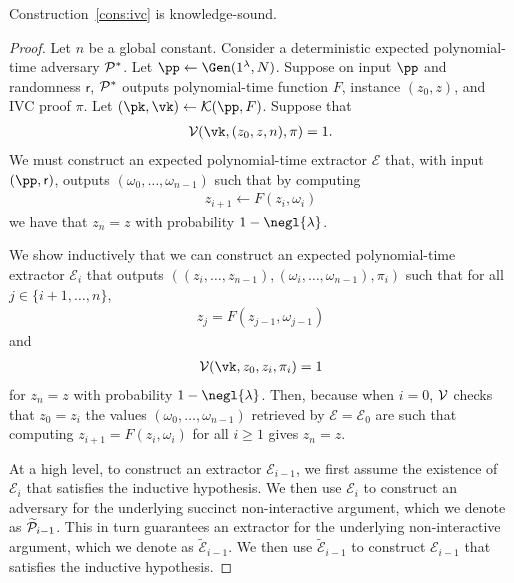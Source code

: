 \begin{lemma}
 Construction~\ref{cons:ivc}
 is knowledge-sound.
\end{lemma}


\begin{proof}
   Let $n$ be a global constant.
   Consider a deterministic expected polynomial-time adversary $\mathcal{P}^*$.
   Let $\pp \gets \Gen(1^{\lambda}, N)$.
   Suppose 
   on input $\pp$ and randomness $\mathsf{r}$,
   $\mathcal{P}^*$
   outputs 
   polynomial-time function $F$,
   instance $(z_0, z)$,
   and IVC proof $\pi$. 
   Let $(\pk, \vk) \gets \En(\pp, F)$.
   Suppose that
   \begin{align*}
     \V(\vk, (z_0, z, n), \pi) = 1.
   \end{align*}
   We must construct an expected polynomial-time extractor $\mathcal{E}$
   that, 
   with input $(\pp, \mathsf{r})$,
   outputs $(\omega_0, \ldots, \omega_{n - 1})$ 
   such that by computing
   \begin{align*}
     z_{i + 1} \gets F(z_{i}, \omega_{i})
   \end{align*}
   we have that $z_n = z$ with probability 
   $1 - \negl{\lambda}$.
   
   We show inductively that we can construct an expected polynomial-time extractor $\mathcal{E}_i$ that outputs 
   $((z_i, \ldots, z_{n - 1}), (\omega_i, \ldots, \omega_{n - 1}), \pi_i)$ such that for all $j \in  \{i + 1, \ldots, n\}$,
   \begin{align*}
     z_j = F(z_{j - 1}, \omega_{j - 1})
   \end{align*}
   and 
   \begin{align}\label{eq:ih:2}
     \V(\vk, z_0, z_i, \pi_i) = 1
   \end{align}
   for $z_n = z$ with probability $1 - \negl{\lambda}$.
   Then, 
   because when $i = 0$,
   $\mathcal{V}$ checks that $z_0 = z_i$ 
   the values $(\omega_0, \ldots, \omega_{n - 1})$ 
   retrieved by $\mathcal{E} = \mathcal{E}_0$
   are such that computing  
   $z_{i + 1} = F(z_i, \omega_i)$ for all $i \geq 1$ gives $z_n = z$.
   
   At a high level,
   to construct an extractor $\mathcal{E}_{i - 1}$,
   we first assume the existence of $\mathcal{E}_i$ that satisfies the inductive hypothesis. 
   We then use $\mathcal{E}_i$ to construct an adversary 
   for the underlying succinct non-interactive argument, which we denote as $\widetilde{\mathcal{P}}_{i - 1}$.
   This in turn guarantees an extractor for the underlying non-interactive argument,
   which we denote as $\widetilde{\mathcal{E}}_{i - 1}$. 
   We then use $\widetilde{\mathcal{E}}_{i - 1}$ to construct $\mathcal{E}_{i - 1}$ that satisfies the inductive hypothesis.
   

\end{proof}
